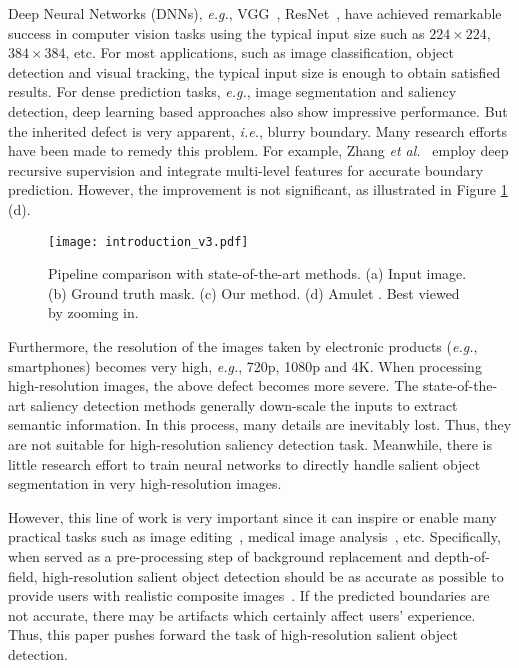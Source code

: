 \documentclass[10pt,twocolumn,letterpaper]{article}
\begin{document}
Deep Neural Networks (DNNs), \emph{e.g.}, VGG~\cite{simonyan2014very}, ResNet~\cite{he2016deep}, have achieved remarkable success in computer vision tasks using the typical input size such as $224\times224$, $384\times384$, etc. For most applications, such as image classification, object detection and visual tracking, the typical input size is enough to obtain satisfied results. For dense prediction tasks, \emph{e.g.}, image segmentation and saliency detection, deep learning based approaches also show impressive performance. But the inherited defect is very apparent, \emph{i.e.}, blurry boundary. Many research efforts have been made to remedy this problem. For example, Zhang \emph{et al.}~\cite{zhang2017amulet} employ deep recursive supervision and integrate multi-level features for accurate boundary prediction.
However, the improvement is not significant, as illustrated in Figure \ref{fig:intro} (d).
\begin{figure}
\centering
\texttt{[image: introduction\_v3.pdf]}\\
\caption{Pipeline comparison with state-of-the-art methods. (a) Input image. (b) Ground truth mask.  (c) Our method. (d) Amulet \cite{zhang2017amulet}. Best viewed by zooming in.}
\label{fig:intro}
\vspace{-5mm}
\end{figure}

Furthermore, the resolution of the images taken by electronic products (\emph{e.g.}, smartphones) becomes very high, \emph{e.g.}, 720p, 1080p and 4K. When processing high-resolution images, the above defect becomes more severe. The state-of-the-art saliency detection methods generally down-scale the inputs to extract semantic information. In this process, many details are inevitably lost. Thus, they are not suitable for high-resolution saliency detection task.
Meanwhile, there is little research effort to train neural networks to directly handle salient object segmentation in very high-resolution images.


However, this line of work is very important since it can inspire or enable many practical tasks such as image editing~\cite{tsai2016sky,xiao2019auto,lischinski2006interactive}, medical image analysis~\cite{chen2019learning}, etc. Specifically, when served as a pre-processing step of background replacement and
depth-of-field, high-resolution salient object detection should be as accurate as possible to provide users with realistic composite images~\cite{shen2016automatic}. If the predicted boundaries are not accurate, there may be artifacts which certainly affect users' experience. Thus, this paper pushes forward the task of high-resolution salient object detection.
\end{document}
